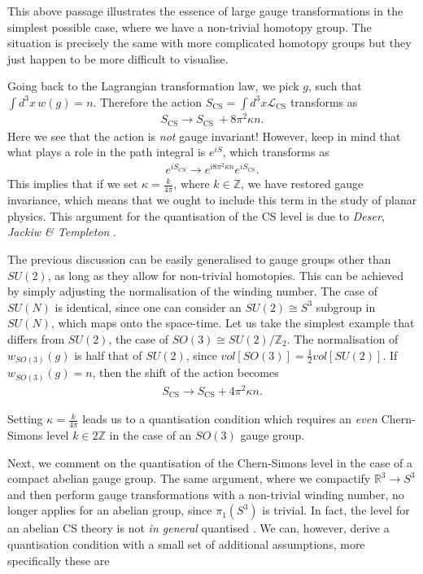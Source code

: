 This above passage illustrates the essence of large gauge transformations in the simplest possible case, where we have a non-trivial homotopy group. The situation is precisely the same with more complicated homotopy groups but they just happen to be more difficult to visualise.

    Going back to the Lagrangian transformation law, we pick $g$, such that $\int d^3 x \,w(g)=n$. Therefore the action $S_{\text{CS}} = \int d^3x \mathcal{L}_{\text{CS}}$ transforms as
    \begin{align}
        S_{\text{CS}} \rightarrow S_{\text{CS } }+ 8 \pi^2 \kappa n.
    \end{align}
    Here we see that the action is \textit{not} gauge invariant! However, keep in mind that what plays a role in the path integral is $e^{i S}$, which transforms as
    \begin{align}
        e^{i S_{CS}} \rightarrow e^{i 8 \pi^2 \kappa n} e^{i S_{\text{CS}}}.
    \end{align}
    This implies that if we set $\kappa = \frac{k}{4 \pi}$, where $k\in \mathbb{Z}$, we have restored gauge invariance, which means that we ought to include this term in the study of planar physics. This argument for the quantisation of the CS level is due to \textit{Deser, Jackiw \& Templeton} \cite{Deser:1981wh}. 

    The previous discussion can be easily generalised to gauge groups  other than $SU(2)$, as long as they allow for non-trivial homotopies. This can be achieved by simply adjusting the normalisation of the winding number. The case of $SU(N)$ is identical, since one can consider an $SU(2) \cong S^3$ subgroup in $SU(N)$, which maps onto the space-time. Let us take the simplest example that differs from $SU(2)$, the case of $SO(3)\cong SU(2)/ \mathbb{Z}_2$. The normalisation of $w_{SO(3)}(g)$ is half that of $SU(2)$, since $vol[SO(3)] = \frac{1}{2} vol[SU(2)]$. If $w_{SO(3)}(g)=n$, then the shift of the action becomes 
\begin{align}
    S_{\text{CS}} \rightarrow S_{\text{CS}}+ 4\pi^2 \kappa n.
\end{align}

Setting $\kappa = \frac{k}{4 \pi}$ leads us to a quantisation condition which requires an \textit{even} Chern-Simons level $k \in 2\mathbb{Z}$ in the case of an $SO(3)$ gauge group.

Next, we comment on the quantisation of the Chern-Simons level in the case of a compact abelian gauge group. The same argument, where we compactify $\mathbb{R}^3 \rightarrow S^{3}$ and then perform gauge transformations with a non-trivial winding number, no longer applies for an abelian group, since $\pi_1(S^3)$ is trivial. In fact, the level for an abelian CS theory is not \textit{in general} quantised \cite{Polychronakos:1990xq}. We can, however, derive a quantisation condition with a small set of additional assumptions, more specifically these are

